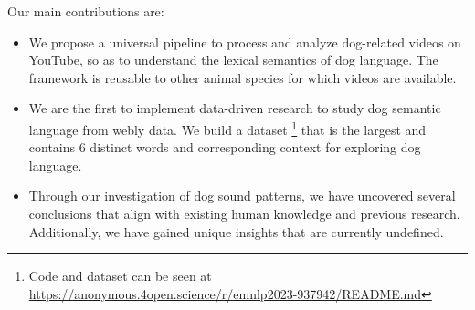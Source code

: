 Our main contributions are:
\begin{itemize}
	\item We propose a universal pipeline to process and analyze
dog-related videos on YouTube, so as to understand the lexical semantics of 
dog language. The framework is reusable to other animal species for which videos are available.
\item We are the first to implement data-driven research to study dog semantic language from webly data. We build a dataset \footnote{Code and dataset can be seen at \url{https://anonymous.4open.science/r/emnlp2023-937942/README.md}} that is the largest and contains 6 distinct words and corresponding context for exploring dog language. 
\item Through our investigation of dog sound patterns, we have uncovered several conclusions that align with existing human knowledge and previous research. Additionally, we have gained unique insights that are currently undefined.
\end{itemize}

